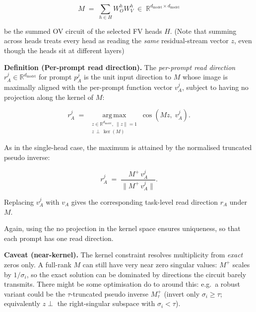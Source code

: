 \documentclass[
]{article}
\begin{document}
\[
M \;=\; \sum_{h \in H} W_O^h W_V^h \;\in\; \mathbb{R}^{d_{\mathrm{model}} \times d_{\mathrm{model}}} \tag{3}
\]

be the summed OV circuit of the selected FV heads \(H\). (Note that
summing across heads treats every head as reading the \emph{same}
residual-stream vector \(z\), even though the heads sit at different
layers)

\textbf{Definition (Per-prompt read direction).} The \emph{per-prompt
read direction} \(r^j_A \in \mathbb{R}^{d_{\mathrm{model}}}\) for prompt
\(p_A^j\) is the unit input direction to \(M\) whose image is maximally
aligned with the per-prompt function vector \(v^j_A\), subject to having
no projection along the kernel of \(M\):

\[
r^j_A \;=\; \operatorname*{arg\,max}_{\substack{z \in \mathbb{R}^{d_{\mathrm{model}}},\; \|z\| = 1 \\ z \,\perp\, \ker(M)}} \cos\!\left(M z,\; v^j_A\right). \tag{4}
\]

As in the single-head case, the maximum is attained by the normalised
truncated pseudo inverse:

\[
r^j_A \;=\; \frac{M^{+}\, v^j_A}{\|M^{+}\, v^j_A\|}. \tag{5}
\]

Replacing \(v^j_A\) with \(v_A\) gives the corresponding task-level read
direction \(r_A\) under \(M\).

Again, using the no projection in the kernel space ensures uniqueness,
so that each prompt has one read direction.

\textbf{Caveat (near-kernel).} The kernel constraint resolves
multiplicity from \emph{exact} zeros only. A full-rank \(M\) can still
have very near zero singular values: \(M^{+}\) scales by
\(1/\sigma_i\), so the exact solution can be dominated by directions the
circuit barely transmits. There might be some optimisation do to around
this: e.g.~a robust variant could be the \(\tau\)-truncated pseudo
inverse \(M^{+}_\tau\) (invert only \(\sigma_i \ge \tau\); equivalently
\(z \perp\) the right-singular subspace with \(\sigma_i < \tau\)).
\end{document}
